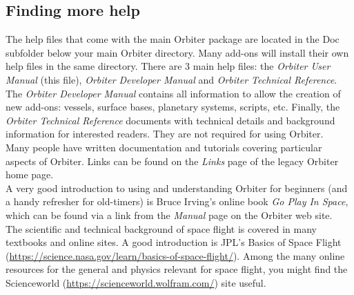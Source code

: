 \documentclass[Orbiter User Manual.tex]{subfiles}
\begin{document}
\subsection{Finding more help}
The help files that come with the main Orbiter package are located in the Doc subfolder below your main Orbiter directory. Many add-ons will install their own help files in the same directory. There are 3 main help files: the \textit{Orbiter User Manual} (this file), \textit{Orbiter Developer Manual} and \textit{Orbiter Technical Reference}.\\
The \textit{Orbiter Developer Manual} contains all information to allow the creation of new add-ons: vessels, surface bases, planetary systems, scripts, etc. Finally, the \textit{Orbiter Technical Reference} documents with technical details and background information for interested readers. They are not required for using Orbiter.\\
Many people have written documentation and tutorials covering particular aspects of Orbiter. Links can be found on the \textit{Links} page of the legacy Orbiter home page.\\
A very good introduction to using and understanding Orbiter for beginners (and a handy refresher for old-timers) is Bruce Irving's online book \textit{Go Play In Space}, which can be found via a link from the \textit{Manual} page on the Orbiter web site.\\
The scientific and technical background of space flight is covered in many textbooks and online sites. A good introduction is JPL's Basics of Space Flight (\url{https://science.nasa.gov/learn/basics-of-space-flight/}). Among the many online resources for the general and physics relevant for space flight, you might find the Scienceworld (\url{https://scienceworld.wolfram.com/}) site useful.
\end{document}
